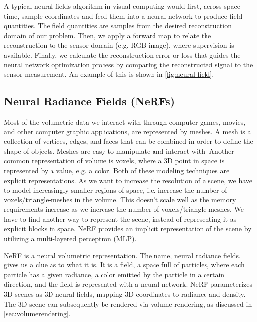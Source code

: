 A typical neural fields algorithm in visual computing would first, across space-time, sample coordinates and feed them into a neural network to produce field quantities. The field quantities are samples from the desired reconstruction domain of our problem. Then, we apply a forward map to relate the reconstruction to the sensor domain (e.g. RGB image), where supervision is available. Finally, we calculate the reconstruction error or loss that guides the neural network optimization process by comparing the reconstructed signal to the sensor measurement. An example of this is shown in \autoref{fig:neural-field}.





\subsection{Neural Radiance Fields (NeRFs)}
Most of the volumetric data we interact with through computer games, movies, and other computer graphic applications, are represented by meshes. A mesh is a collection of vertices, edges, and faces that can be combined in order to define the shape of objects. Meshes are easy to manipulate and interact with. Another common representation of volume is voxels, where a 3D point in space is represented by a value, e.g. a color. Both of these modeling techniques are explicit representations. As we want to increase the resolution of a scene, we have to model increasingly smaller regions of space, i.e. increase the number of voxels/triangle-meshes in the volume. This doesn't scale well as the memory requirements increase as we increase the number of voxels/triangle-meshes. We have to find another way to represent the scene, instead of representing it as explicit blocks in space. NeRF provides an implicit representation of the scene by utilizing a multi-layered perceptron (MLP).

NeRF is a neural volumetric representation. The name, neural radiance fields, gives us a clue as to what it is. It is a field, a space full of particles, where each particle has a given radiance, a color emitted by the particle in a certain direction, and the field is represented with a neural network. NeRF parameterizes 3D scenes as 3D neural fields, mapping 3D coordinates to radiance and density. The 3D scene can subsequently be rendered via volume rendering, as discussed in \autoref{sec:volumerendering}.

